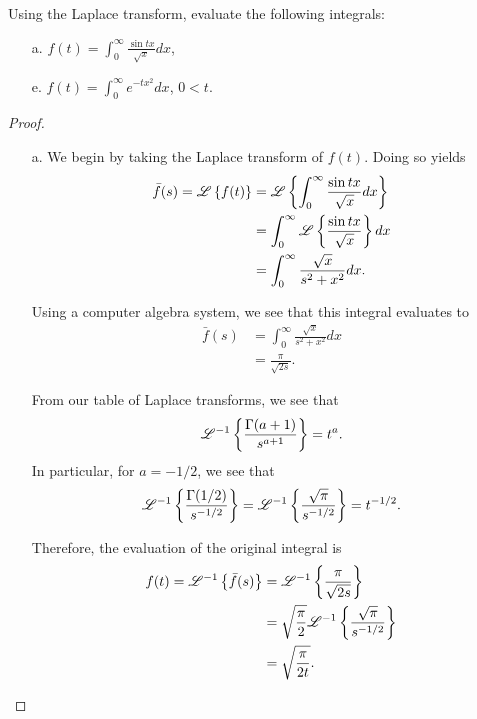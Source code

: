 \begin{problem}{4.28}
  Using the Laplace transform, evaluate the following integrals:
  \begin{enumerate}
    \item[a.] $\displaystyle f(t) = \int_0^\infty \frac{\sin tx}{\sqrt{x}} dx$,
    \item[e.] $\displaystyle f(t) = \int_0^\infty e^{-tx^2} dx$, $0 < t$.
  \end{enumerate}
\end{problem}

\begin{proof}
  \begin{enumerate}
    \item[a.] We begin by taking the Laplace transform of $f(t)$. Doing so yields
      \begin{align*}
        \bar{f}(s) = \mathscr{L}\left\{ {f(t)} \right\}
        &= \mathscr{L}\left\{ {\int_0^\infty \frac{\sin tx}{\sqrt{x}} dx} \right\}\\
        &= \int_0^\infty \mathscr{L}\left\{ {\frac{\sin tx}{\sqrt{x}} } \right\}dx\\
        &= \int_0^\infty \frac{\sqrt{x}}{s^2+x^2}dx.
      \end{align*}

      Using a computer algebra system, we see that this integral evaluates to
      \begin{align*}
        \bar{f}(s) &= \int_0^\infty \frac{\sqrt{x}}{s^2+x^2}dx \\
        &= \frac{\pi}{\sqrt{2s}}.
      \end{align*}

      From our table of Laplace transforms, we see that
      \begin{align*}
        \mathscr{L}^{-1}\left\{ {\frac{\Gamma(a + 1)}{s^{a+1}}} \right\} = t^a.
      \end{align*}
      In particular, for $a = -1/2$, we see that
      \begin{align*}
        \mathscr{L}^{-1}\left\{ {\frac{\Gamma(1/2)}{s^{-1/2}}} \right\} = \mathscr{L}^{-1}\left\{ {\frac{\sqrt{\pi}}{s^{-1/2}}} \right\} = t^{-1/2}.
      \end{align*}

      Therefore, the evaluation of the original integral is
      \begin{align*}
        f(t) = \mathscr{L}^{-1}\left\{ {\bar{f}(s)} \right\} &= \mathscr{L}^{-1}\left\{ {\frac{\pi}{\sqrt{2s}}} \right\} \\
        &= \sqrt{\frac{\pi}{2}}\mathscr{L}^{-1}\left\{ {\frac{\sqrt{\pi}}{s^{-1/2}}} \right\} \\
        &= \sqrt{\frac{\pi}{2t}}.
      \end{align*}


\end{enumerate}
\end{proof}
